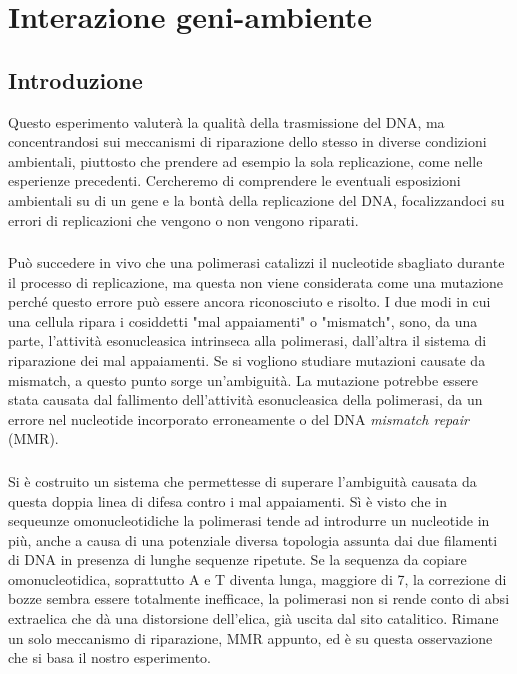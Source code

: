\section*{Interazione geni-ambiente}
\subsection*{Introduzione}
Questo esperimento valuterà la qualità della trasmissione del DNA, ma concentrandosi sui meccanismi di riparazione dello stesso in diverse condizioni ambientali, piuttosto che prendere ad esempio la sola replicazione, come nelle esperienze precedenti. 
Cercheremo di comprendere le eventuali esposizioni ambientali su di un gene e la bontà della replicazione del DNA, focalizzandoci su errori di replicazioni che vengono o non vengono riparati. 

 \subsubsection*{}
 Può succedere in vivo che una polimerasi catalizzi il nucleotide sbagliato durante il processo di replicazione, ma questa non viene considerata come una mutazione perché questo errore può essere ancora riconosciuto e risolto. 
I due modi in cui una cellula ripara i cosiddetti "mal appaiamenti" o "mismatch", sono, da una parte, l'attività esonucleasica intrinseca alla polimerasi, dall'altra il sistema di riparazione dei mal appaiamenti. 
Se si vogliono studiare mutazioni causate da mismatch, a questo punto sorge un'ambiguità. 
La mutazione potrebbe essere stata causata dal fallimento dell'attività esonucleasica della polimerasi, da un errore nel nucleotide incorporato erroneamente o del DNA \textit{mismatch repair} (MMR). 

 \subsubsection*{}
 Si è costruito un sistema che permettesse di superare l'ambiguità causata da questa doppia linea di difesa contro i mal appaiamenti. 
Sì è visto che in sequeunze omonucleotidiche la polimerasi tende ad introdurre un nucleotide in più, anche a causa di una potenziale diversa topologia assunta dai due filamenti di DNA in presenza di lunghe sequenze ripetute. 
Se la sequenza da copiare omonucleotidica, soprattutto A e T diventa lunga, maggiore di 7, la correzione di bozze sembra essere totalmente inefficace, la polimerasi non si rende conto di absi extraelica che dà una distorsione dell'elica, già uscita dal sito catalitico. 
Rimane un solo meccanismo di riparazione, MMR appunto, ed è su questa osservazione che si basa il nostro esperimento. 

